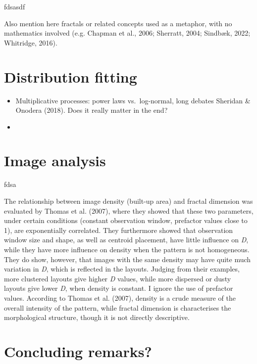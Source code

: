 \documentclass[
  12pt,
]{book}
\begin{document}
fdsasdf

Also mention here fractals or related concepts used as a metaphor, with no mathematics involved (e.g. Chapman et al., 2006; Sherratt, 2004; Sindbæk, 2022; Whitridge, 2016).

\hypertarget{distribution-fitting}{%
\section{Distribution fitting}\label{distribution-fitting}}

\begin{itemize}
\item
  Multiplicative processes: power laws vs.~log-normal, long debates Sheridan \& Onodera (2018). Does it really matter in the end?
\item
\end{itemize}

\hypertarget{image-analysis}{%
\section{Image analysis}\label{image-analysis}}

fdsa

The relationship between image density (built-up area) and fractal dimension was evaluated by Thomas et al. (2007), where they showed that these two parameters, under certain conditions (constant observation window, prefactor values close to 1), are exponentially correlated. They furthermore showed that observation window size and shape, as well as centroid placement, have little influence on \emph{D}, while they have more influence on density when the pattern is not homogeneous. They do show, however, that images with the same density may have quite much variation in \emph{D}, which is reflected in the layouts. Judging from their examples, more clustered layouts give higher \emph{D} values, while more dispersed or dusty layouts give lower \emph{D}, when density is constant. I ignore the use of prefactor values. According to Thomas et al. (2007), density is a crude measure of the overall intensity of the pattern, while fractal dimension is characterises the morphological structure, though it is not directly descriptive.

\hypertarget{concluding-remarks}{%
\section{Concluding remarks?}\label{concluding-remarks}}
\end{document}
